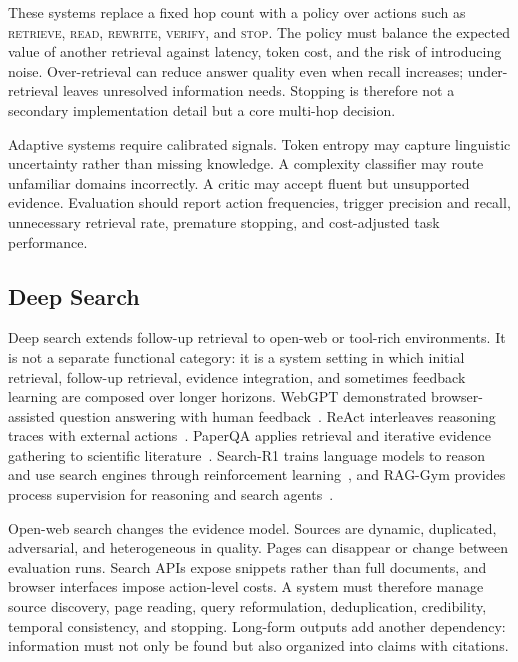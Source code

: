 These systems replace a fixed hop count with a policy over actions such as \textsc{retrieve}, \textsc{read}, \textsc{rewrite}, \textsc{verify}, and \textsc{stop}. The policy must balance the expected value of another retrieval against latency, token cost, and the risk of introducing noise. Over-retrieval can reduce answer quality even when recall increases; under-retrieval leaves unresolved information needs. Stopping is therefore not a secondary implementation detail but a core multi-hop decision.

Adaptive systems require calibrated signals. Token entropy may capture linguistic uncertainty rather than missing knowledge. A complexity classifier may route unfamiliar domains incorrectly. A critic may accept fluent but unsupported evidence. Evaluation should report action frequencies, trigger precision and recall, unnecessary retrieval rate, premature stopping, and cost-adjusted task performance.

\subsection{Deep Search}
\label{subsec:deep_search}

Deep search extends follow-up retrieval to open-web or tool-rich environments. It is not a separate functional category: it is a system setting in which initial retrieval, follow-up retrieval, evidence integration, and sometimes feedback learning are composed over longer horizons. WebGPT demonstrated browser-assisted question answering with human feedback~\cite{nakano2021webgpt}. ReAct interleaves reasoning traces with external actions~\cite{yao2023react}. PaperQA applies retrieval and iterative evidence gathering to scientific literature~\cite{lala2023paperqa}. Search-R1 trains language models to reason and use search engines through reinforcement learning~\cite{jin2025searchr1}, and RAG-Gym provides process supervision for reasoning and search agents~\cite{xiong2025raggym}.

Open-web search changes the evidence model. Sources are dynamic, duplicated, adversarial, and heterogeneous in quality. Pages can disappear or change between evaluation runs. Search APIs expose snippets rather than full documents, and browser interfaces impose action-level costs. A system must therefore manage source discovery, page reading, query reformulation, deduplication, credibility, temporal consistency, and stopping. Long-form outputs add another dependency: information must not only be found but also organized into claims with citations.

